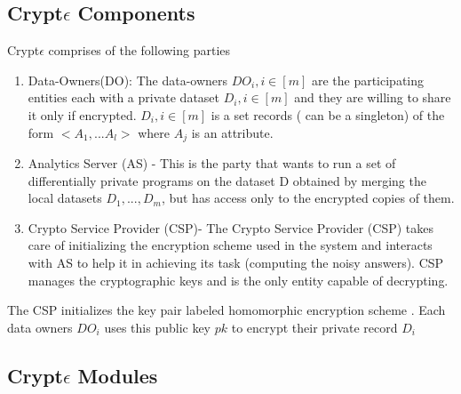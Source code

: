 \subsection{Crypt$\epsilon$ Components}
Crypt$\epsilon$ comprises of the following parties\begin{enumerate}
 \item Data-Owners(DO): The data-owners $DO_i, i \in [m]$ are the participating entities each with  a
private dataset $D_i, i \in [m]$ and they are willing to share it only if encrypted. $D_i, i \in [m]$ is a set records ( can be a singleton) of the form $<A_1,...A_l>$ where $A_j$ is an attribute.  \item Analytics Server (AS) - This is the party that wants to run a set of differentially private programs  on the dataset D obtained by merging the local datasets $D_1, ... , D_m$, but has
access only to the encrypted copies of them. 
\item Crypto Service Provider (CSP)-
 The Crypto Service Provider (CSP) takes care of initializing the encryption scheme used
in the system and interacts with AS to help it in achieving its task (computing the
noisy answers). CSP manages the cryptographic keys and is the only entity
capable of decrypting.
\end{enumerate}
The CSP initializes the key pair labeled homomorphic encryption scheme . Each data owners $DO_i$ uses this public key $pk$ to encrypt their private record $D_i$ 
\subsection{Crypt$\epsilon$ Modules}
